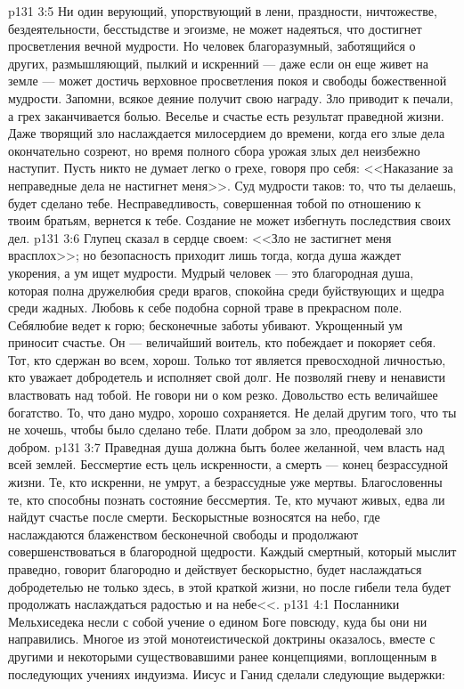 \vs p131 3:5 Ни один верующий, упорствующий в лени, праздности, ничтожестве, бездеятельности, бесстыдстве и эгоизме, не может надеяться, что достигнет просветления вечной мудрости. Но человек благоразумный, заботящийся о других, размышляющий, пылкий и искренний --- даже если он еще живет на земле --- может достичь верховное просветления покоя и свободы божественной мудрости. Запомни, всякое деяние получит свою награду. Зло приводит к печали, а грех заканчивается болью. Веселье и счастье есть результат праведной жизни. Даже творящий зло наслаждается милосердием до времени, когда его злые дела окончательно созреют, но время полного сбора урожая злых дел неизбежно наступит. Пусть никто не думает легко о грехе, говоря про себя: <<Наказание за неправедные дела не настигнет меня>>. Суд мудрости таков: то, что ты делаешь, будет сделано тебе. Несправедливость, совершенная тобой по отношению к твоим братьям, вернется к тебе. Создание не может избегнуть последствия своих дел.
\vs p131 3:6 Глупец сказал в сердце своем: <<Зло не застигнет меня врасплох>>; но безопасность приходит лишь тогда, когда душа жаждет укорения, а ум ищет мудрости. Мудрый человек --- это благородная душа, которая полна дружелюбия среди врагов, спокойна среди буйствующих и щедра среди жадных. Любовь к себе подобна сорной траве в прекрасном поле. Себялюбие ведет к горю; бесконечные заботы убивают. Укрощенный ум приносит счастье. Он --- величайший воитель, кто побеждает и покоряет себя. Тот, кто сдержан во всем, хорош. Только тот является превосходной личностью, кто уважает добродетель и исполняет свой долг. Не позволяй гневу и ненависти властвовать над тобой. Не говори ни о ком резко. Довольство есть величайшее богатство. То, что дано мудро, хорошо сохраняется. Не делай другим того, что ты не хочешь, чтобы было сделано тебе. Плати добром за зло, преодолевай зло добром.
\vs p131 3:7 Праведная душа должна быть более желанной, чем власть над всей землей. Бессмертие есть цель искренности, а смерть --- конец безрассудной жизни. Те, кто искренни, не умрут, а безрассудные уже мертвы. Благословенны те, кто способны познать состояние бессмертия. Те, кто мучают живых, едва ли найдут счастье после смерти. Бескорыстные возносятся на небо, где наслаждаются блаженством бесконечной свободы и продолжают совершенствоваться в благородной щедрости. Каждый смертный, который мыслит праведно, говорит благородно и действует бескорыстно, будет наслаждаться добродетелью не только здесь, в этой краткой жизни, но после гибели тела будет продолжать наслаждаться радостью и на небе<<.
\vs p131 4:1 Посланники Мельхиседека несли с собой учение о едином Боге повсюду, куда бы они ни направились. Многое из этой монотеистической доктрины оказалось, вместе с другими и некоторыми существовавшими ранее концепциями, воплощенным в последующих учениях индуизма. Иисус и Ганид сделали следующие выдержки:
